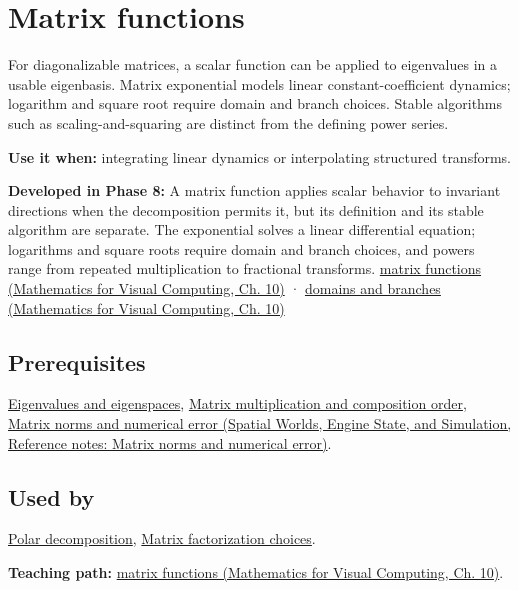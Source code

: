 \hypertarget{appendix-0f4bc2bf2b1f}{}\label{referencestart:appendix-0f4bc2bf2b1f}
\section{Matrix functions}\label{appendix-0f4bc2bf2b1f-matrix-functions}

\hypertarget{appendix-0f4bc2bf2b1f-matrix-functions}{}

For diagonalizable matrices, a scalar function can be applied to eigenvalues in a usable eigenbasis. Matrix exponential models linear constant-coefficient dynamics; logarithm and square root require domain and branch choices. Stable algorithms such as scaling-and-squaring are distinct from the defining power series.

\textbf{Use it when:} integrating linear dynamics or interpolating structured transforms.

\textbf{Developed in Phase 8:} A matrix function applies scalar behavior to invariant directions when the decomposition permits it, but its definition and its stable algorithm are separate. The exponential solves a linear differential equation; logarithms and square roots require domain and branch choices, and powers range from repeated multiplication to fractional transforms. \href{../02-Mathematics-for-Visual-Computing/main.pdf\#nameddest=02-foundations-ii-ch026-matrix-functions-turn-repeated-linear-actions-into-one-operator}{matrix functions (Mathematics for Visual Computing, Ch. 10)} · \href{../02-Mathematics-for-Visual-Computing/main.pdf\#nameddest=02-foundations-ii-ch026-logarithms-and-square-roots-need-domains-and-branches}{domains and branches (Mathematics for Visual Computing, Ch. 10)}

\subsection{Prerequisites}\label{appendix-0f4bc2bf2b1f-prerequisites}

\hypertarget{appendix-0f4bc2bf2b1f-prerequisites}{}

\hyperref[appendix-0b3be18411f9]{Eigenvalues and eigenspaces}, \hyperref[appendix-ab31ef447dbf]{Matrix multiplication and composition order}, \href{../05-Spatial-Worlds-Engine-State-and-Simulation/main.pdf\#nameddest=appendix-f8657bac66e5}{Matrix norms and numerical error (Spatial Worlds, Engine State, and Simulation, Reference notes: Matrix norms and numerical error)}.

\subsection{Used by}\label{appendix-0f4bc2bf2b1f-used-by}

\hypertarget{appendix-0f4bc2bf2b1f-used-by}{}

\hyperref[appendix-73f5bcf7a462]{Polar decomposition}, \hyperref[appendix-221a483bec2d]{Matrix factorization choices}.

\textbf{Teaching path:} \href{../02-Mathematics-for-Visual-Computing/main.pdf\#nameddest=02-foundations-ii-ch026-matrix-functions-turn-repeated-linear-actions-into-one-operator}{matrix functions (Mathematics for Visual Computing, Ch. 10)}.
